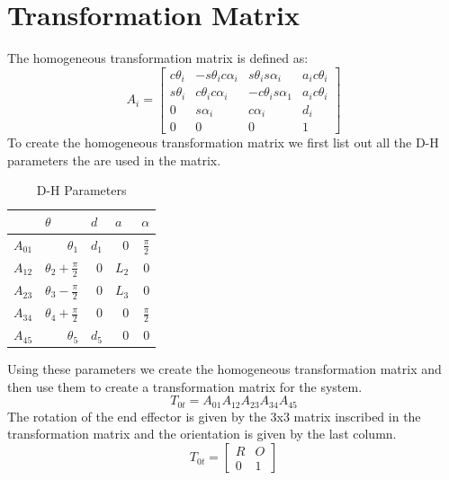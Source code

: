 \documentclass[12pt]{article}
\begin{document}
\section{Transformation Matrix}
The homogeneous transformation matrix is defined as:
\[
   A_i=\begin{bmatrix}
     c\theta_i & -s\theta_ic\alpha_i & s\theta_is\alpha_i & a_ic\theta_i \\
     s\theta_i & c\theta_ic\alpha_i & -c\theta_is\alpha_1 & a_ic\theta_i \\
     0 & s\alpha_i & c\alpha_i & d_i \\
     0 & 0 & 0 & 1
   \end{bmatrix}
\]
To create the homogeneous transformation matrix we first list out all the D-H parameters the are used in the matrix.
\setlength{\tabcolsep}{12pt}
\begin{table}[htbp]
  \centering
  \caption{D-H Parameters}
    \begin{tabular}{|l|rrrr|}
    \hline
          & \multicolumn{1}{l}{$\theta$} & \multicolumn{1}{l}{$d$} & \multicolumn{1}{l}{$a$} & \multicolumn{1}{l|}{$\alpha$} \\
    \hline
    $A_{01}$   & $\theta_1$     & $d_1$     & 0     & $\frac{\pi}{2}$ \\
    $A_{12}$   & $\theta_2 + \frac{\pi}{2}$     & 0     & $L_2$     & 0 \\
    $A_{23}$   & $\theta_3 - \frac{\pi}{2}$     & 0     & $L_3$     & 0 \\
    $A_{34}$   & $\theta_4 + \frac{\pi}{2}$     & 0     & 0     & $\frac{\pi}{2}$ \\
    $A_{45}$   & $\theta_5$     & $d_5$     & 0     & 0 \\
    \hline
    \end{tabular}%
\end{table}%

Using these parameters we create the homogeneous transformation matrix and then use them to create a transformation matrix for the system.
\begin{equation}
    T_{0t}=A_{01}A_{12}A_{23}A_{34}A_{45}
\end{equation}
The rotation of the end effector is given by the 3x3 matrix inscribed in the transformation matrix and the orientation is given by the last column.
\[
T_{0t}=\begin{bmatrix}
R&O\\
0&1
\end{bmatrix}
\]
\pagebreak
\end{document}
